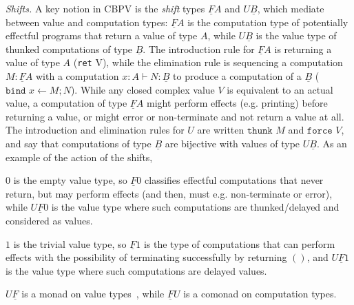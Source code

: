 \documentclass[acmsmall,screen,12pt]{acmart}
\renewcommand{\u}{\underline}
\newcommand{\bindXtoYinZ}[2]{\kw{bind}#2 \leftarrow #1;}
\newcommand{\kw}[1]{\texttt{#1}\,\,}
\newcommand{\ret}{\kw{ret}}
\newcommand{\thunk}{\kw{thunk}}
\newcommand{\force}{\kw{force}}
\begin{document}
\emph{Shifts.}
A key notion in CBPV is the \emph{shift} types $\u F A$ and $U \u B$,
which mediate between value and computation types: $\u F A$ is the
computation type of potentially effectful programs that return a value
of type $A$, while $U \u B$ is the value type of thunked computations of
type $\u B$.  The introduction rule for $\u F A$ is returning a value of
type $A$ (\ret{V}), while the elimination rule is sequencing a
computation $M : \u F A$ with a computation $x : A \vdash N : \u B$ to
produce a computation of a $\u B$ ($\bindXtoYinZ{M}{x}{N}$).  While any
closed complex value $V$ is equivalent to an actual value, a computation
of type $\u F A$ might perform effects (e.g. printing) before returning
a value, or might error or non-terminate and not return a value at all.
The introduction and elimination rules for $U$ are written $\thunk{M}$
and $\force{V}$, and say that computations of type $\u B$ are bijective
with values of type $U \u B$.  As an example of the action of the
shifts,
\begin{longonly}
  $0$ is the empty value type, so $\u F 0$ classifies effectful
computations that never return, but may perform effects (and then, must
e.g. non-terminate or error), while $U \u F 0$ is the value type where
such computations are thunked/delayed and considered as values.
\end{longonly}
$1$ is the trivial value type, so $\u F 1$ is the type of computations
that can perform effects with the possibility of terminating
  successfully by returning $()$, and $U \u F 1$ is the value type where
  such computations are delayed values.
\begin{longonly}  
  $U \u F$ is a monad on value
  types~\citep{moggi91}, while $\u F U$ is a comonad on computation types.
\end{longonly}
\end{document}
